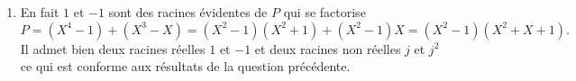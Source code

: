 \begin{enumerate}
  \item En fait $1$ et $-1$ sont des racines évidentes de $P$ qui se factorise
\[
  P = (X^4 - 1) + (X^3 - X)
  = (X^2 -1)(X^2 + 1) + (X^2 - 1)X
  = (X^2 - 1)(X^2 + X +1).
\]
Il admet bien deux racines réelles $1$ et $-1$ et deux racines non réelles $j$ et $j^2$ ce qui est conforme aux résultats de la question précédente.
\end{enumerate}
